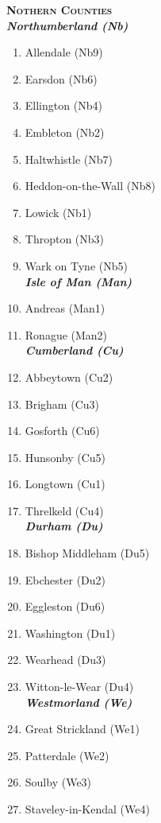 \begin{refsection}
 	\textbf{\textsc{Nothern Counties}}\\
	\emph{\textbf{Northumberland (Nb)}}
	\begin{multicols}{2}
		\begin{enumerate}
			\item Allendale (Nb9)
			\item Earsdon (Nb6)
			\item Ellington (Nb4)
			\item Embleton (Nb2)
			\item Haltwhistle (Nb7)
			\item Heddon-on-the-Wall (Nb8)
			\item Lowick (Nb1)
			\item Thropton (Nb3)
			\item Wark on Tyne (Nb5)\\
			\emph{\textbf{Isle of Man (Man)}} 
			\item Andreas (Man1)
			\item Ronague (Man2) \\
			\emph{\textbf{Cumberland (Cu)}} 
			\item Abbeytown (Cu2)
			\item Brigham (Cu3)
			\item Gosforth (Cu6)
			\item Hunsonby (Cu5)
			\item Longtown (Cu1)
			\item Threlkeld (Cu4)\\
			\emph{\textbf{Durham (Du)}} 
			\item Bishop Middleham (Du5)
			\item Ebchester (Du2)
			\item Eggleston (Du6)
			\item Washington (Du1)
			\item Wearhead (Du3)
			\item Witton-le-Wear (Du4) \\
			\emph{\textbf{Westmorland (We)}}
			\item Great Strickland (We1)
			\item Patterdale (We2)
			\item Soulby (We3)
			\item Staveley-in-Kendal (We4) \\

\end{enumerate}
\end{multicols}
\end{refsection}
